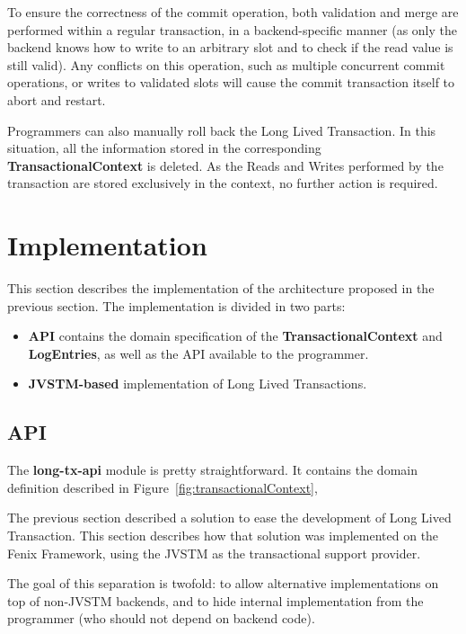 To ensure the correctness of the commit operation, both validation and
merge are performed within a regular transaction, in a
backend-specific manner (as only the backend knows how to write to an
arbitrary slot and to check if the read value is still valid). Any
conflicts on this operation, such as multiple concurrent commit
operations, or writes to validated slots will cause the commit
transaction itself to abort and restart.

Programmers can also manually roll back the Long Lived Transaction. In
this situation, all the information stored in the corresponding {\bf
  TransactionalContext} is deleted. As the Reads and Writes performed
by the transaction are stored exclusively in the context, no further
action is required.

\section{Implementation}
\label{sec:impl}

This section describes the implementation of the architecture proposed
in the previous section. The implementation is divided in two parts:

\begin{itemize}

\item {\bf API} contains the domain specification of the {\bf
    TransactionalContext} and {\bf LogEntries}, as well as the API
  available to the programmer.

\item {\bf JVSTM-based} implementation of Long Lived Transactions.

\end{itemize}

\subsection{API}

The {\bf long-tx-api} module is pretty straightforward. It contains
the domain definition described in Figure~\ref{fig:transactionalContext}, 

The previous section described a solution to ease the development of
Long Lived Transaction. This section describes how that solution was
implemented on the Fenix Framework, using the JVSTM as the
transactional support provider.

The goal of this separation is twofold: to allow alternative
implementations on top of non-JVSTM backends, and to hide internal
implementation from the programmer (who should not depend on backend
code).

